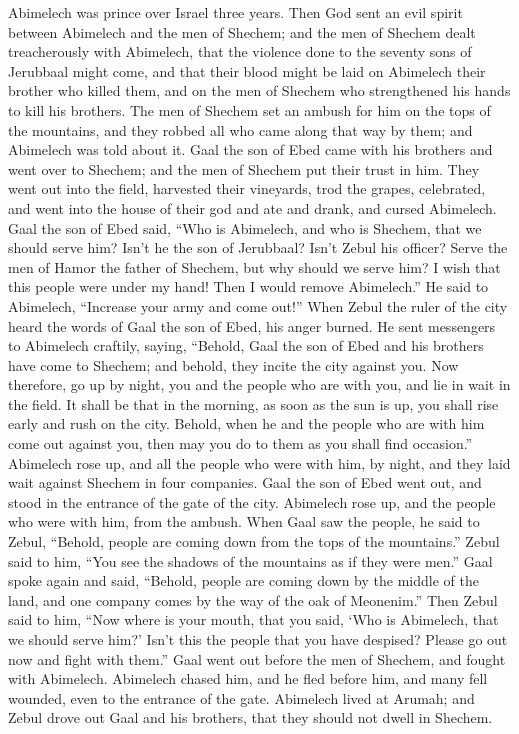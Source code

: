  Abimelech was prince over Israel three years.
 Then God sent an evil spirit between Abimelech and the
men of Shechem; and the men of Shechem dealt treacherously with
Abimelech,  that the violence done to the seventy sons of
Jerubbaal might come, and that their blood might be laid on Abimelech
their brother who killed them, and on the men of Shechem who
strengthened his hands to kill his brothers.  The men of
Shechem set an ambush for him on the tops of the mountains, and they
robbed all who came along that way by them; and Abimelech was told about
it.  Gaal the son of Ebed came with his brothers and went
over to Shechem; and the men of Shechem put their trust in him.
 They went out into the field, harvested their vineyards,
trod the grapes, celebrated, and went into the house of their god and
ate and drank, and cursed Abimelech.  Gaal the son of
Ebed said, ``Who is Abimelech, and who is Shechem, that we should serve
him? Isn't he the son of Jerubbaal? Isn't Zebul his officer? Serve the
men of Hamor the father of Shechem, but why should we serve him?
 I wish that this people were under my hand! Then I would
remove Abimelech.'' He said to Abimelech, ``Increase your army and come
out!''  When Zebul the ruler of the city heard the words
of Gaal the son of Ebed, his anger burned.  He sent
messengers to Abimelech craftily, saying, ``Behold, Gaal the son of Ebed
and his brothers have come to Shechem; and behold, they incite the city
against you.  Now therefore, go up by night, you and the
people who are with you, and lie in wait in the field. 
It shall be that in the morning, as soon as the sun is up, you shall
rise early and rush on the city. Behold, when he and the people who are
with him come out against you, then may you do to them as you shall find
occasion.''  Abimelech rose up, and all the people who
were with him, by night, and they laid wait against Shechem in four
companies.  Gaal the son of Ebed went out, and stood in
the entrance of the gate of the city. Abimelech rose up, and the people
who were with him, from the ambush.  When Gaal saw the
people, he said to Zebul, ``Behold, people are coming down from the tops
of the mountains.'' Zebul said to him, ``You see the shadows of the
mountains as if they were men.''  Gaal spoke again and
said, ``Behold, people are coming down by the middle of the land, and
one company comes by the way of the oak of Meonenim.'' 
Then Zebul said to him, ``Now where is your mouth, that you said, `Who
is Abimelech, that we should serve him?' Isn't this the people that you
have despised? Please go out now and fight with them.'' 
Gaal went out before the men of Shechem, and fought with Abimelech.
 Abimelech chased him, and he fled before him, and many
fell wounded, even to the entrance of the gate. 
Abimelech lived at Arumah; and Zebul drove out Gaal and his brothers,
that they should not dwell in Shechem.

